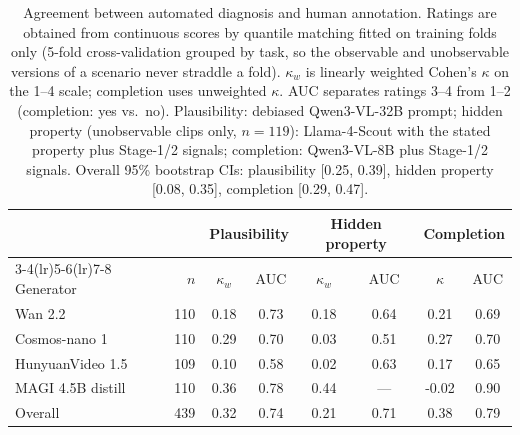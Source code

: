 \begin{table}[t]
    \centering
    \small
    \setlength{\tabcolsep}{4pt}
    \begin{tabular}{@{}lrcccccc@{}}
        \toprule
        & & \multicolumn{2}{c}{Plausibility} & \multicolumn{2}{c}{Hidden property} & \multicolumn{2}{c}{Completion} \\
        \cmidrule(lr){3-4}\cmidrule(lr){5-6}\cmidrule(lr){7-8}
        Generator & $n$ & $\kappa_w$ & AUC & $\kappa_w$ & AUC & $\kappa$ & AUC \\
        \midrule
        Wan 2.2 & 110 & 0.18 & 0.73 & 0.18 & 0.64 & 0.21 & 0.69 \\
        Cosmos-nano 1 & 110 & 0.29 & 0.70 & 0.03 & 0.51 & 0.27 & 0.70 \\
        HunyuanVideo 1.5 & 109 & 0.10 & 0.58 & 0.02 & 0.63 & 0.17 & 0.65 \\
        MAGI 4.5B distill & 110 & 0.36 & 0.78 & 0.44 & --- & -0.02 & 0.90 \\
        \midrule
        Overall & 439 & 0.32 & 0.74 & 0.21 & 0.71 & 0.38 & 0.79 \\
        \bottomrule
    \end{tabular}
    \caption{Agreement between automated diagnosis and human annotation. Ratings are obtained from continuous scores by quantile matching fitted on training folds only (5-fold cross-validation grouped by task, so the observable and unobservable versions of a scenario never straddle a fold). $\kappa_w$ is linearly weighted Cohen's $\kappa$ on the 1--4 scale; completion uses unweighted $\kappa$. AUC separates ratings 3--4 from 1--2 (completion: yes vs.\ no). Plausibility: debiased Qwen3-VL-32B prompt; hidden property (unobservable clips only, $n{=}119$): Llama-4-Scout with the stated property plus Stage-1/2 signals; completion: Qwen3-VL-8B plus Stage-1/2 signals. Overall 95\% bootstrap CIs: plausibility [0.25, 0.39], hidden property [0.08, 0.35], completion [0.29, 0.47].}
    \label{tab:pipeline-human-agreement}
\end{table}
